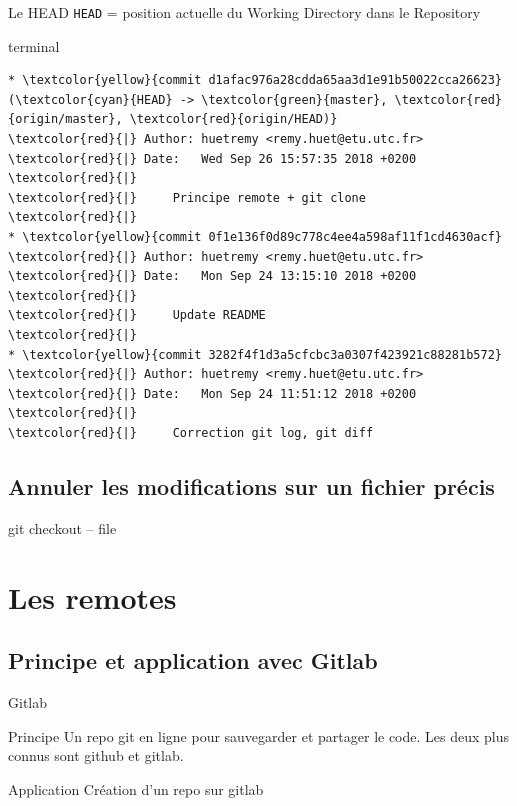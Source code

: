\documentclass[usepdftitle=false]{beamer}
\begin{document}
\begin{frame}[fragile]{Le HEAD}
		\verb+HEAD+ = position actuelle du Working Directory dans le Repository

	\begin{beamercolorbox}[rounded=true,shadow=true]{terminal}
\begin{Verbatim}
* \textcolor{yellow}{commit d1afac976a28cdda65aa3d1e91b50022cca26623} (\textcolor{cyan}{HEAD} -> \textcolor{green}{master}, \textcolor{red}{origin/master}, \textcolor{red}{origin/HEAD)}
\textcolor{red}{|} Author: huetremy <remy.huet@etu.utc.fr>
\textcolor{red}{|} Date:   Wed Sep 26 15:57:35 2018 +0200
\textcolor{red}{|}
\textcolor{red}{|}     Principe remote + git clone
\textcolor{red}{|}
* \textcolor{yellow}{commit 0f1e136f0d89c778c4ee4a598af11f1cd4630acf}
\textcolor{red}{|} Author: huetremy <remy.huet@etu.utc.fr>
\textcolor{red}{|} Date:   Mon Sep 24 13:15:10 2018 +0200
\textcolor{red}{|}
\textcolor{red}{|}     Update README
\textcolor{red}{|}
* \textcolor{yellow}{commit 3282f4f1d3a5cfcbc3a0307f423921c88281b572}
\textcolor{red}{|} Author: huetremy <remy.huet@etu.utc.fr>
\textcolor{red}{|} Date:   Mon Sep 24 11:51:12 2018 +0200
\textcolor{red}{|}
\textcolor{red}{|}     Correction git log, git diff
\end{Verbatim}
	\end{beamercolorbox}
\end{frame}

\subsection{Annuler les modifications sur un fichier précis}

\begin{frame}{git checkout -- file}
\end{frame}

\section{Les remotes}

\subsection{Principe et application avec Gitlab}

\begin{frame}{Gitlab}
	\begin{block}{Principe}
		Un repo git en ligne pour sauvegarder et partager le code. Les deux plus connus sont github et gitlab.
	\end{block}
	\begin{block}{Application}
		Création d'un repo sur gitlab
	\end{block}
\end{frame}
\end{document}
